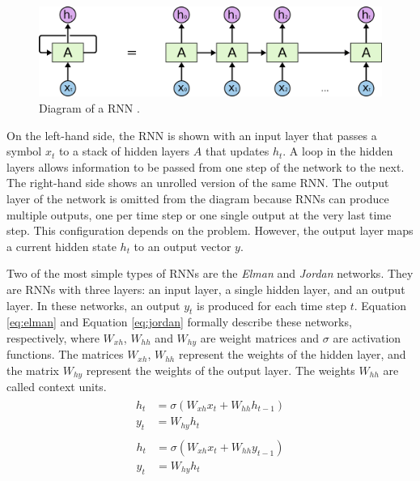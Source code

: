 \begin{figure}[!h]
\centering
\includegraphics[width=0.9\columnwidth]{imgs/background/rnn.png}
\caption{Diagram of a RNN \cite{olah2015understanding}.}
\label{fig:rnn}
\end{figure}

On the left-hand side, the RNN is shown with an input layer that passes a symbol $x_t$ to a stack of hidden layers $A$ that updates $h_t$. A loop in the hidden layers allows information to be passed from one step of the network to the next. The right-hand side shows an unrolled version of the same RNN. The output layer of the network is omitted from the diagram because RNNs can produce multiple outputs, one per time step or one single output at the very last time step. This configuration depends on the problem. However, the output layer maps a current hidden state $h_t$ to an output vector $y$.

Two of the most simple types of RNNs are the \textit{Elman} and \textit{Jordan} networks. They are RNNs with three layers: an input layer, a single hidden layer, and an output layer. In these networks, an output $y_t$ is produced for each time step $t$. Equation \ref{eq:elman} and Equation \ref{eq:jordan} formally describe these networks, respectively, where $W_{xh}$, $W_{hh}$ and $W_{hy}$ are weight matrices and $\sigma$ are activation functions. The matrices $W_{xh}$, $W_{hh}$ represent the weights of the hidden layer, and the matrix $W_{hy}$ represent the weights of the output layer. The weights $W_{hh}$ are called context units.
\begin{align}
\begin{split}
    h_t &= \sigma(W_{xh}x_t + W_{hh}h_{t-1}) \\
    y_t &= W_{hy}h_t
\end{split}
\label{eq:elman}
\end{align}
\begin{align}
\begin{split}
    h_t &= \sigma(W_{xh}x_t + W_{hh}y_{t-1}) \\
    y_t &= W_{hy}h_t
\end{split}
\label{eq:jordan}
\end{align}

